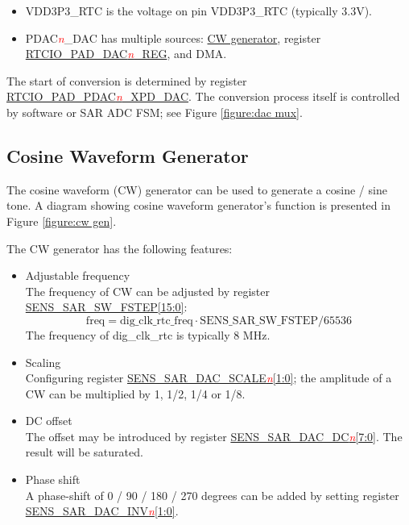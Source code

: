 \documentclass[main\_\_EN.tex]{subfiles}
\begin{document}
\begin{itemize}
    \item VDD3P3\_RTC is the voltage on pin VDD3P3\_RTC (typically 3.3V).
    \item PDAC\textcolor{red}{\it{n}}\_DAC has multiple sources: \hyperref[ssec:cosine gen]{CW generator}, register \hyperref[regdesc:RTCIOPADDAC1REG]{RTCIO\_PAD\_DAC\textcolor{red}{\it{n}}\_REG}, and DMA.
\end{itemize}

The start of conversion is determined by register \hyperref[regdesc:RTCIOPADDAC1REG]{RTCIO\_PAD\_PDAC\textcolor{red}{\textit{n}}\_XPD\_DAC}. The conversion process itself is controlled by software or SAR ADC FSM; see Figure \ref{figure:dac mux}.

\subsection{Cosine Waveform Generator}
\label{ssec:cosine gen}

The cosine waveform (CW) generator can be used to generate a cosine / sine tone. A diagram showing cosine waveform generator’s function is presented in Figure \ref{figure:cw gen}.

The CW generator has the following features:
\begin{itemize}
    \item Adjustable frequency\\
    The frequency of CW can be adjusted by register \hyperref[regdesc:SENSSARDACCTRL1REG]{SENS\_SAR\_SW\_FSTEP[15:0]}:
    $$\mathrm{freq = dig\_clk\_rtc\_freq \cdot SENS\_SAR\_SW\_FSTEP / 65536}$$
    The frequency of dig\_clk\_rtc is typically 8 MHz.
    \item Scaling\\
    Configuring register \hyperref[regdesc:SENSSARDACCTRL2REG]{SENS\_SAR\_DAC\_SCALE\textcolor{red}{\textit{n}}[1:0]}; the amplitude of a CW can be multiplied by 1, 1/2, 1/4 or 1/8.
    \item DC offset\\
    The offset may be introduced by register \hyperref[regdesc:SENSSARREADCTRL2REG]{SENS\_SAR\_DAC\_DC\textcolor{red}{\textit{n}}[7:0]}. The result will be saturated.
    \item Phase shift\\
    A phase-shift of 0 / 90 / 180 / 270 degrees can be added by setting register \hyperref[regdesc:SENSSARDACCTRL2REG]{SENS\_SAR\_DAC\_INV\textcolor{red}{\textit{n}}[1:0]}.
\end{itemize}
\end{document}
